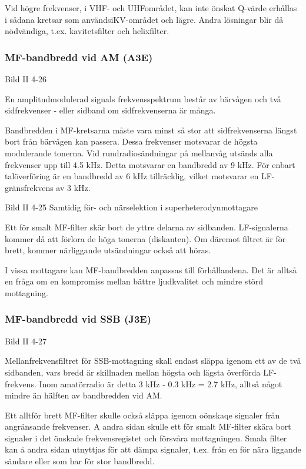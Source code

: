 Vid högre frekvenser, i VHF- och UHFområdet, kan inte önskat Q-värde
erhållas i sådana kretsar som användsiKV-området och lägre. Andra
lösningar blir då nödvändiga, t.ex. kavitetsfilter och helixfilter.

\subsubsection{MF-bandbredd vid AM (A3E)}

Bild II 4-26

En amplitudmodulerad signals frekvensspektrum består av bärvågen och
två sidfrekvenser - eller sidband om sidfrekvenserna är många.

Bandbredden i MF-kretsarna måste vara minst så stor att
sidfrekvenserna längst bort från bärvågen kan passera. Dessa
frekvenser motsvarar de högsta modulerande tonerna. Vid
rundradiosändningar på mellanvåg utsänds alla frekvenser upp till 4.5
kHz.  Detta motsvarar en bandbredd av 9 kHz.  För enbart talöverföring
är en bandbredd av 6 kHz tillräcklig, vilket motsvarar en
LF-gränsfrekvens av 3 kHz.

Bild II 4-25 Samtidig för- och närselektion i superheterodynmottagare

Ett för smalt MF-filter skär bort de yttre delarna av
sidbanden. LF-signalerna kommer då att förlora de höga tonerna
(diskanten). Om däremot filtret är för brett, kommer närliggande
utsändningar också att höras.

I vissa mottagare kan MF-bandbredden anpassas till förhållandena. Det
är alltså en fråga om en kompromiss mellan bättre ljudkvalitet och
mindre störd mottagning.

\subsubsection{MF-bandbredd vid SSB (J3E)}

Bild II 4-27

Mellanfrekvensfiltret för SSB-mottagning skall endast släppa igenom
ett av de två sidbanden, vars bredd är skillnaden mellan högsta och
lägsta överförda LF-frekvens.  Inom amatörradio är detta 3 kHz - 0.3 kHz
= 2.7 kHz, alltså något mindre än hälften av bandbredden vid AM.

Ett alltför brett MF-filter skulle också släppa igenom oönskaqe
signaler från angränsande frekvenser. A andra sidan skulle ett för
smalt MF-filter skära bort signaler i det önskade frekvensregistet och
försvåra mottagningen. Smala filter kan å andra sidan utnyttjas för
att dämpa signaler, t.ex. från en för nära liggande sändare eller som
har för stor bandbredd.


